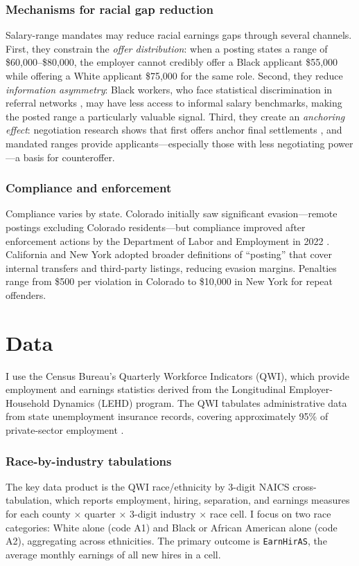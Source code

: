\documentclass[12pt]{article}
\begin{document}
\subsubsection*{Mechanisms for racial gap reduction} Salary-range mandates may reduce racial earnings gaps through several channels. First, they constrain the \textit{offer distribution}: when a posting states a range of \$60,000--\$80,000, the employer cannot credibly offer a Black applicant \$55,000 while offering a White applicant \$75,000 for the same role. Second, they reduce \textit{information asymmetry}: Black workers, who face statistical discrimination in referral networks \citep{bayer2018divergent}, may have less access to informal salary benchmarks, making the posted range a particularly valuable signal. Third, they create an \textit{anchoring effect}: negotiation research shows that first offers anchor final settlements \citep{galinsky2001first}, and mandated ranges provide applicants---especially those with less negotiating power---a basis for counteroffer.

\subsubsection*{Compliance and enforcement} Compliance varies by state. Colorado initially saw significant evasion---remote postings excluding Colorado residents---but compliance improved after enforcement actions by the Department of Labor and Employment in 2022 \citep{hansen2024pay}. California and New York adopted broader definitions of ``posting'' that cover internal transfers and third-party listings, reducing evasion margins. Penalties range from \$500 per violation in Colorado to \$10,000 in New York for repeat offenders.

\section{Data}

I use the Census Bureau's Quarterly Workforce Indicators (QWI), which provide employment and earnings statistics derived from the Longitudinal Employer-Household Dynamics (LEHD) program. The QWI tabulates administrative data from state unemployment insurance records, covering approximately 95\% of private-sector employment \citep{abowd2009lehd}.

\subsubsection*{Race-by-industry tabulations} The key data product is the QWI race/ethnicity by 3-digit NAICS cross-tabulation, which reports employment, hiring, separation, and earnings measures for each county $\times$ quarter $\times$ 3-digit industry $\times$ race cell. I focus on two race categories: White alone (code A1) and Black or African American alone (code A2), aggregating across ethnicities. The primary outcome is \texttt{EarnHirAS}, the average monthly earnings of all new hires in a cell.
\end{document}
